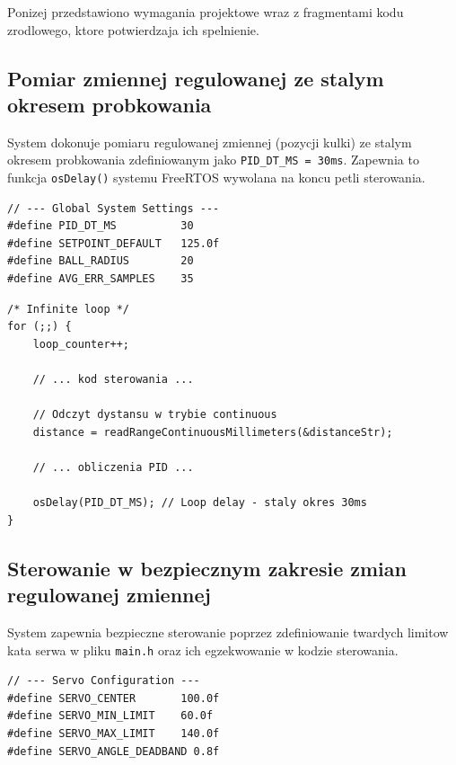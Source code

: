 \documentclass[11pt]{article}
\begin{document}
Ponizej przedstawiono wymagania projektowe wraz z fragmentami kodu zrodlowego, ktore potwierdzaja ich spelnienie.

\subsection{Pomiar zmiennej regulowanej ze stalym okresem probkowania}

System dokonuje pomiaru regulowanej zmiennej (pozycji kulki) ze stalym okresem probkowania zdefiniowanym jako \texttt{PID\_DT\_MS = 30ms}. Zapewnia to funkcja \texttt{osDelay()} systemu FreeRTOS wywolana na koncu petli sterowania.

\begin{lstlisting}[caption={Staly okres probkowania (main.h)}, style=cstyle]
// --- Global System Settings ---
#define PID_DT_MS          30
#define SETPOINT_DEFAULT   125.0f
#define BALL_RADIUS        20
#define AVG_ERR_SAMPLES    35
\end{lstlisting}

\begin{lstlisting}[caption={Implementacja stalego okresu w petli sterowania (main.c)}, style=cstyle]
/* Infinite loop */
for (;;) {
    loop_counter++;
    
    // ... kod sterowania ...
    
    // Odczyt dystansu w trybie continuous
    distance = readRangeContinuousMillimeters(&distanceStr);
    
    // ... obliczenia PID ...
    
    osDelay(PID_DT_MS); // Loop delay - staly okres 30ms
}
\end{lstlisting}

\subsection{Sterowanie w bezpiecznym zakresie zmian regulowanej zmiennej}

System zapewnia bezpieczne sterowanie poprzez zdefiniowanie twardych limitow kata serwa w pliku \texttt{main.h} oraz ich egzekwowanie w kodzie sterowania.

\begin{lstlisting}[caption={Definicje limitow bezpieczenstwa serwa (main.h)}, style=cstyle]
// --- Servo Configuration ---
#define SERVO_CENTER       100.0f
#define SERVO_MIN_LIMIT    60.0f
#define SERVO_MAX_LIMIT    140.0f
#define SERVO_ANGLE_DEADBAND 0.8f
\end{lstlisting}
\end{document}
